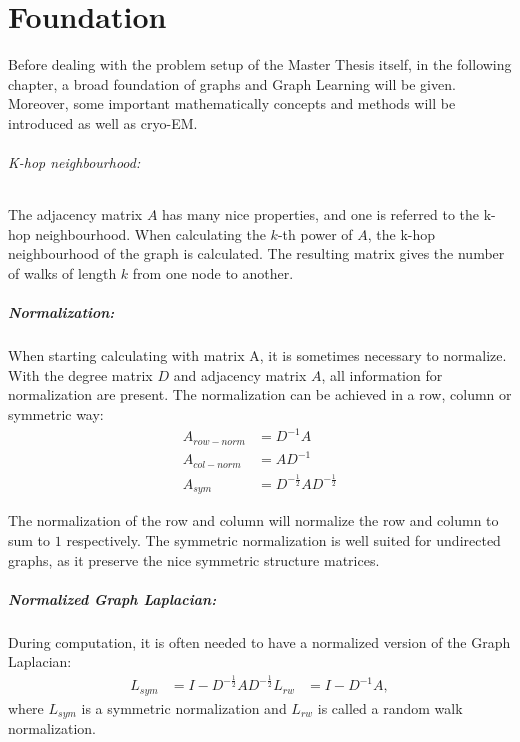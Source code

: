 \chapter{Foundation}
\label{sec:foundation}

Before dealing with the problem setup of the Master Thesis itself, in the following chapter, a broad foundation
of graphs and Graph Learning will be given. Moreover, some important mathematically concepts and methods will be introduced as well as cryo-EM.

\subparagraph{K-hop neighbourhood:}
\label{sec:K-hop neighbourhood}
The adjacency matrix $A$ has many nice properties, and one is referred to the k-hop neighbourhood. 
When calculating the $k$-th power of $A$, the k-hop neighbourhood of the graph is calculated.
The resulting matrix gives the number of walks of length $k$ from one node to another.

\paragraph{Normalization:}
When starting calculating with matrix A, it is sometimes necessary to normalize.
With the degree matrix $D$ and adjacency matrix $A$, all information for normalization are present.
The normalization can be achieved in a row, column or symmetric way:
\begin{equation}
    \begin{aligned}
        A_{row-norm} &= D^{-1} A \\
        A_{col-norm} &= A D^{-1} \\
        A_{sym}      &=  D^{-\frac{1}{2}} A D^{-\frac{1}{2}}    
    \end{aligned}
\end{equation}

The normalization of the row and column will normalize the row and column to sum to $1$ respectively.
The symmetric normalization is well suited for undirected graphs, as it preserve the nice symmetric structure matrices.




\paragraph{Normalized Graph Laplacian:}
During computation, it is often needed to have a normalized version of the Graph Laplacian: \newline
\begin{equation}
    \label{eq:normalizedGraphLaplacian}
    \begin{aligned}
        L_{sym} &= I - D^{-\frac{1}{2}} A D^{-\frac{1}{2}}
        L_{rw}  &= I - D^{-1} A,
    \end{aligned}
\end{equation}
where $L_{sym}$ is a symmetric normalization and $L_{rw}$ is called a random walk normalization.


